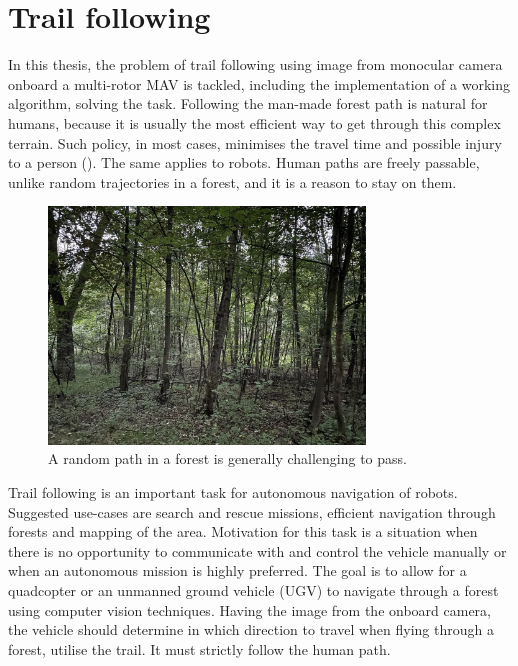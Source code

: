 \section{Trail following}

In this thesis, the problem of trail following using image from monocular camera onboard a multi-rotor \acs{MAV} is tackled, including the implementation of a working algorithm, solving the task. Following the man-made forest path is natural for humans, because it is usually the most efficient way to get through this complex terrain. Such policy, in most cases, minimises the travel time and possible injury to a person (). The same applies to robots. Human paths are freely passable, unlike random trajectories in a forest, and it is a reason to stay on them.

\begin{figure}[!h]
  \centering
  \includegraphics[width=0.75\textwidth]{./fig/photos/challenging_path.jpg}

  \caption{A random path in a forest is generally challenging to pass.}
  \label{fig:challenging_path}
\end{figure}

Trail following is an important task for autonomous navigation of robots. Suggested use-cases are search and rescue missions, efficient navigation through forests and mapping of the area. Motivation for this task is a situation when there is no opportunity to communicate with and control the vehicle manually or when an autonomous mission is highly preferred. The goal is to allow for a quadcopter or an unmanned ground vehicle (UGV) to navigate through a forest using computer vision techniques. Having the image from the onboard camera, the vehicle should determine in which direction to travel when flying through a forest, utilise the trail. It must strictly follow the human path.

